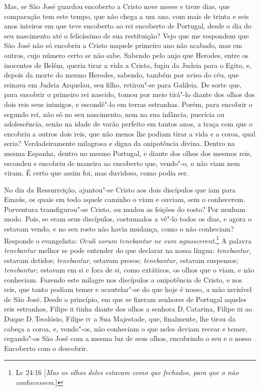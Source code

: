 Mas, se São José guardou encoberto a Cristo nove meses e treze dias, que
comparação tem este tempo, que não chega a um ano, com mais de trinta e
seis anos inteiros em que teve encoberto ao rei encoberto de Portugal,
desde o dia do seu nascimento até o felicíssimo de sua restituição? Vejo
que me respondem que São José não só encobriu a Cristo naquele primeiro
ano não acabado, mas em outros, cujo número certo se não sabe. Sabendo
pelo anjo que Herodes, entre os inocentes de Belém, queria tirar a vida
a Cristo, fugiu da Judeia para o Egito, e, depois da morte do mesmo
Herodes, sabendo, também por aviso do céu, que reinava em Judeia
Arquelau, seu filho, retirou"-se para Galileia. De sorte que, para
encobrir o primeiro rei nascido, tomou por meio tirá"-lo diante dos olhos
dos dois reis seus inimigos, e escondê"-lo em terras estranhas.
Porém, para encobrir o segundo rei, não só no seu nascimento, nem na sua
infância, puerícia ou adolescência, senão na idade de varão perfeito em
tantos anos, a traça com que o encobriu a outros dois reis, que não
menos lhe podiam tirar a vida e a coroa, qual seria? Verdadeiramente
milagrosa e digna da onipotência divina. Dentro na mesma Espanha, dentro
no mesmo Portugal, e diante dos olhos dos mesmos reis, escondeu e
encobriu de maneira ao encoberto que, vendo"-o, o não viam nem viram. É
certo que assim foi, mas duvidoso, como podia ser.

No dia da Ressurreição, ajuntou"-se Cristo aos dois discípulos que iam
para Emaús, os quais em todo aquele caminho o viam e ouviam, sem o
conhecerem. Porventura transfigurou"-se Cristo, ou mudou as feições do
rosto? Por nenhum modo. Pois, se eram seus discípulos, costumados a
vê"-lo todos os dias, e agora o estavam vendo, e no seu rosto não havia
mudança, como o não conheciam? Responde o evangelista: \emph{Oculi eorum
tenebantur ne eum agnoscerent}.\footnote{Lc 24:16 [\textit{Mas os olhos deles estavam como que fechados, para que o não conhecessem}.]} A palavra \emph{tenebantur}
melhor se pode entender do que declarar na nossa língua:
\emph{tenebantur,} estavam detidos; \emph{tenebantur,} estavam presos;
\emph{tenebantur,} estavam suspensos; \emph{tenebantur,} estavam em si e
fora de si, como extáticos, os olhos que o viam, e não conheciam.
Fazendo este milagre nos discípulos a onipotência de Cristo, e nos reis,
que tanto podiam temer e acautelar"-se do que hoje é nosso, a mão
invisível de São José.
Desde o princípio, em que se fizeram senhores de Portugal aqueles reis
estranhos, Filipe \textsc{ii} tinha diante dos olhos a senhora D.\,Catarina,
Filipe \textsc{iii} ao Duque D.\,Teodósio, Filipe \textsc{iv} a Sua Majestade, que,
finalmente, lhe tirou da cabeça a coroa, e, vendo"-os, não conheciam o
que neles deviam recear e temer, cegando"-os São José com a mesma luz de
seus olhos, encobrindo o seu e o nosso Encoberto com o descobrir.

